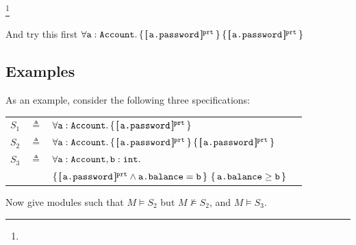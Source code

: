 \footnote{}
%
%
%



And try this first $\TwoStatesQ {\prg{a}:\prg{Account}}  {\inside{\prg{a.password}}} {\inside{\prg{a.password}}}$

\subsection{Examples}
\noindent
As an example, consider the following three  specifications:

\begin{tabular}{lcll}
$S_1$   &     $\triangleq$   & $\forall {{\texttt{a}}:{\texttt{Account}} }.\, {\{}\, [\!\![ \,{\texttt{a.password}}\, ]\!\!]^{{\texttt{prt}}} \,{\}}  $
 \\
 $S_2$   & $\triangleq$   &  $\TwoStatesQ {\prg{a}:\prg{Account}}  {\inside{\prg{a.password}}} {\inside{\prg{a.password}}}$
 \\
$S_3$ & $\triangleq$   &
  $\forall {\texttt{a}}:{\texttt{Account}},{\texttt{b}}:{\texttt{int}}.$\\
  &  &  ${\{}\, [\!\![ \,{\texttt{a.password}}\, ]\!\!]^{{\texttt{prt}}} \wedge {\texttt{a.balance}}={\texttt{b}} \,{\}}  
\  {\{}\,  {\texttt{a.balance}}\geq {\texttt{b}}  \,{\}}$
\end{tabular}

Now give modules such that $M \models S_2$ but $M \not\models S_2$, and $M \models S_3$.



